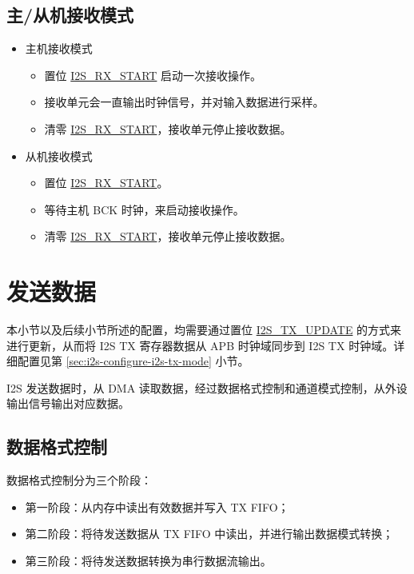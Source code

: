 \documentclass[main\_\_CN.tex]{subfiles}
\begin{document}
\subsection{主/从机接收模式}
\begin{itemize}
    \item 主机接收模式
    \begin{itemize}
        \item 置位 \hyperref[fielddesc:I2SRXSTART]{I2S\_RX\_START} 启动一次接收操作。
        \item 接收单元会一直输出时钟信号，并对输入数据进行采样。
        \item 清零 \hyperref[fielddesc:I2SRXSTART]{I2S\_RX\_START}，接收单元停止接收数据。
    \end{itemize}
    \item 从机接收模式
     \begin{itemize}
        \item 置位 \hyperref[fielddesc:I2SRXSTART]{I2S\_RX\_START}。
        \item 等待主机 BCK 时钟，来启动接收操作。
        \item 清零 \hyperref[fielddesc:I2SRXSTART]{I2S\_RX\_START}，接收单元停止接收数据。
    \end{itemize}
\end{itemize}

\section{发送数据}\label{sec:i2s-tx-data}

\vspace{1em}
\begin{tiplisting}
本小节以及后续小节所述的配置，均需要通过置位 \hyperref[fielddesc:I2STXUPDATE]{I2S\_TX\_UPDATE} 的方式来进行更新，从而将 I2S TX 寄存器数据从 APB 时钟域同步到 I2S TX 时钟域。详细配置见第 \ref{sec:i2s-configure-i2s-tx-mode} 小节。
\end{tiplisting}
\vspace{-1em}
\chipname{} I2S 发送数据时，从 DMA 读取数据，经过数据格式控制和通道模式控制，从外设输出信号输出对应数据。
\subsection{数据格式控制}\label{sec:i2s-data-control}
数据格式控制分为三个阶段：
\begin{itemize}
    \item 第一阶段：从内存中读出有效数据并写入 TX FIFO；
    \item 第二阶段：将待发送数据从 TX FIFO 中读出，并进行输出数据模式转换；
    \item 第三阶段：将待发送数据转换为串行数据流输出。
\end{itemize}
\end{document}
